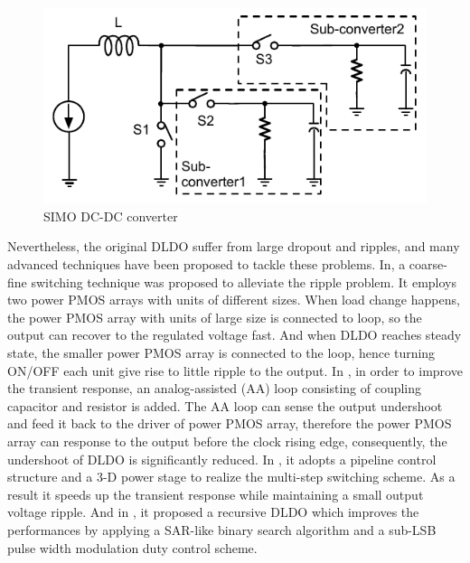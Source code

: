 \documentclass[journal]{IEEEtran}
\begin{document}
\begin{figure}[t!]
    \centering
    \includegraphics[width=\linewidth]{pic/TDM/DCDC.pdf}
    \caption{SIMO DC-DC converter}
    \label{fig:DCDC}
\end{figure}
Nevertheless, the original DLDO suffer from large dropout and ripples, and many advanced techniques have been proposed to tackle these problems. In\cite{coarse-fine}, a coarse-fine switching technique was proposed to alleviate the ripple problem. It employs two power PMOS arrays with units of different sizes. When load change happens, the power PMOS array with units of large size is connected to loop, so the output can recover to the regulated voltage fast. And when DLDO reaches steady state, the smaller power PMOS array is connected to the loop, hence turning ON/OFF each unit give rise to little ripple to the output.  In \cite{AALDO,AALDO1,NANDbasedAAloop}, in order to improve the transient response, an analog-assisted (AA) loop consisting of coupling capacitor and resistor is added. The AA loop can sense the output undershoot and feed it back to the driver of power PMOS array, therefore the power PMOS array can response to the output before the clock rising edge, consequently, the undershoot of DLDO is significantly reduced. In \cite{pipeline}, it adopts a pipeline control structure and a 3-D power stage to realize the multi-step switching scheme. As a result it speeds up the transient response while maintaining a small output voltage ripple. And in \cite{recursive}, it proposed a recursive DLDO which improves the performances by applying a SAR-like binary search algorithm and a sub-LSB pulse width modulation duty control scheme. 
\end{document}
